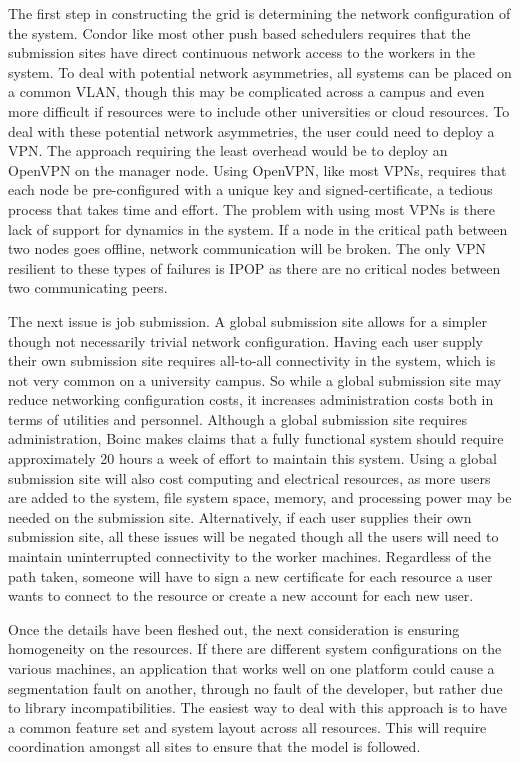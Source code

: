 \documentclass[conference]{IEEEtran}
\begin{document}
The first step in constructing the grid is determining the network
configuration of the system.  Condor like most other push based schedulers
requires that the submission sites have direct continuous network access to the
workers in the system.  To deal with potential network asymmetries, all systems
can be placed on a common VLAN, though this may be complicated across a campus
and even more difficult if resources were to include other universities or
cloud resources.  To deal with these potential network asymmetries, the user
could need to deploy a VPN.  The approach requiring the least overhead would be
to deploy an OpenVPN on the manager node.  Using OpenVPN, like most VPNs,
requires that each node be pre-configured with a unique key and
signed-certificate, a tedious process that takes time and effort.  The problem
with using most VPNs is there lack of support for dynamics in the system.  If a
node in the critical path between two nodes goes offline, network communication
will be broken.  The only VPN resilient to these types of failures is IPOP as
there are no critical nodes between two communicating peers.

The next issue is job submission.  A global submission site allows for a
simpler though not necessarily trivial network configuration.  Having each user
supply their own submission site requires all-to-all connectivity in the
system, which is not very common on a university campus.  So while a global
submission site may reduce networking configuration costs, it increases
administration costs both in terms of utilities and personnel.  Although a
global submission site requires administration, Boinc makes claims that a fully
functional system should require approximately 20 hours a week of effort to
maintain this system.  Using a global submission site will also cost computing
and electrical resources, as more users are added to the system, file system
space, memory, and processing power may be needed on the submission site.
Alternatively, if each user supplies their own submission site, all these
issues will be negated though all the users will need to maintain uninterrupted
connectivity to the worker machines.  Regardless of the path taken, someone
will have to sign a new certificate for each resource a user wants to connect
to the resource or create a new account for each new user.

Once the details have been fleshed out, the next consideration is ensuring
homogeneity on the resources.  If there are different system configurations on
the various machines, an application that works well on one platform could
cause a segmentation fault on another, through no fault of the developer, but
rather due to library incompatibilities.  The easiest way to deal with this
approach is to have a common feature set and system layout across all
resources.  This will require coordination amongst all sites to ensure that the
model is followed.
\end{document}
